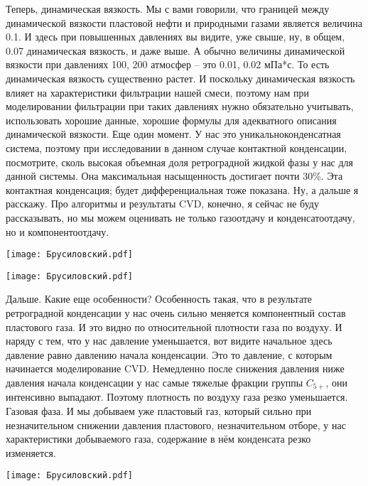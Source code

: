 \documentclass[main.tex]{subfiles}
\begin{document}
Теперь, динамическая вязкость.
Мы с вами говорили, что границей между динамической вязкости пластовой нефти и природными газами является величина 0.1.
И здесь при повышенных давлениях вы видите, уже свыше, ну, в общем, 0.07 динамическая вязкость, и даже выше.
А обычно величины динамической вязкости при давлениях 100, 200 атмосфер -- это 0.01, 0.02 мПа*с.
То есть динамическая вязкость существенно растет.
И поскольку динамическая вязкость влияет на характеристики фильтрации нашей смеси, поэтому нам при моделировании фильтрации при таких давлениях нужно обязательно учитывать, использовать хорошие данные, хорошие формулы для адекватного описания динамической вязкости.
Еще один момент.
У нас это уникальноконденсатная система, поэтому при исследовании в данном случае контактной конденсации, посмотрите, сколь высокая объемная доля ретроградной жидкой фазы у нас для данной системы.
Она максимальная насыщенность достигает почти 30\%.
Эта контактная конденсация; будет дифференциальная тоже показана.
Ну, а дальше я расскажу.
Про алгоритмы и результаты CVD, конечно, я сейчас не буду рассказывать, но мы можем оценивать не только газоотдачу и конденсатоотдачу, но и компонентоотдачу.

\begin{center}
\texttt{[image: Брусиловский.pdf]}
\end{center}

\begin{center}
\texttt{[image: Брусиловский.pdf]}
\end{center}

Дальше.
Какие еще особенности?
Особенность такая, что в результате ретроградной конденсации у нас очень сильно меняется компонентный состав пластового газа.
И это видно по относительной плотности газа по воздуху.
И наряду с тем, что у нас давление уменьшается, вот видите начальное здесь давление равно давлению начала конденсации.
Это то давление, с которым начинается моделирование CVD.
Немедленно после снижения давления ниже давления начала конденсации у нас самые тяжелые фракции группы $C_{5+}$, они интенсивно выпадают.
Поэтому плотность по воздуху газа резко уменьшается.
Газовая фаза.
И мы добываем уже пластовый газ, который сильно при незначительном снижении давления пластового, незначительном отборе, у нас характеристики добываемого газа, содержание в нём конденсата резко изменяется.

\begin{center}
\texttt{[image: Брусиловский.pdf]}
\end{center}
\end{document}
